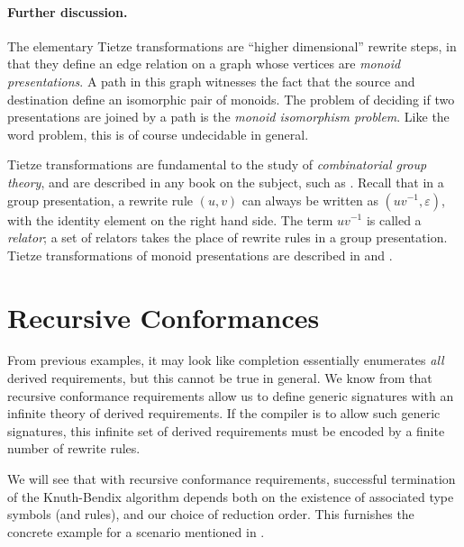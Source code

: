 \documentclass[../generics]{subfiles}
\begin{document}
\paragraph{Further discussion.}
The elementary Tietze transformations are ``higher dimensional'' rewrite steps, in that they define an edge relation on a graph whose vertices are \emph{monoid presentations}. A path in this graph witnesses the fact that the source and destination define an isomorphic pair of monoids. The problem of deciding if two presentations are joined by a path is the \emph{monoid isomorphism problem}. Like the word problem, this is of course undecidable in general.

Tietze transformations are fundamental to the study of \emph{combinatorial group theory}, and are described in any book on the subject, such as \cite{combinatorialgroup}. Recall that in a group presentation, a rewrite rule $(u, v)$ can always be written as $(uv^{-1},\varepsilon)$, with the identity element on the right hand side. The term $uv^{-1}$ is called a \emph{relator}; a set of relators takes the place of rewrite rules in a group presentation. Tietze transformations of monoid presentations are described in \cite{book2012string} and \cite{henry2021tietze}.

\section{Recursive Conformances}\label{recursive conformances redux}

From previous examples, it may look like completion essentially enumerates \emph{all} derived requirements, but this cannot be true in general. We know from  that recursive conformance requirements allow us to define generic signatures with an infinite theory of derived requirements. If the compiler is to allow such generic signatures, this infinite set of derived requirements must be encoded by a finite number of rewrite rules.

We will see that with recursive conformance requirements, successful termination of the Knuth-Bendix algorithm depends both on the existence of associated type symbols (and rules), and our choice of reduction order. This furnishes the concrete example for a scenario mentioned in .
\end{document}
